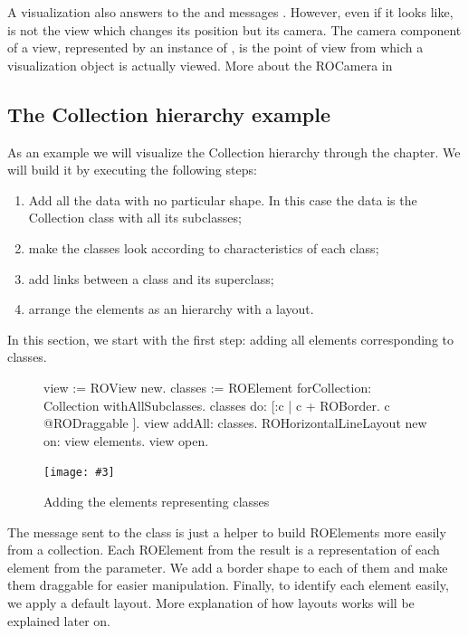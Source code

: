 \documentclass[a4paper,10pt,twoside]{book}
\newcommand{\fig}[4]{
		\begin{figure}[#1]
			\centering
			\texttt{[image: \#3]}
			\caption{\label{fig:#3}#4}
		\end{figure}}
\begin{document}
A visualization  also answers to the  and  messages . However, even if it looks like, is not the view which changes its position but its camera. The camera component of a view, represented by an instance of , is the point of view from which a visualization object is actually viewed. More about the ROCamera in 

\subsection*{The Collection hierarchy example}
As an example we will visualize the Collection hierarchy through the chapter. We will build it by executing the following steps:
\begin{enumerate}
\item Add all the data with no particular shape. In this case the data is the Collection class with all its subclasses;
\item make the classes look according to characteristics of each class;
\item add links between a class and its superclass;
\item arrange the elements as an hierarchy with a layout.
\end{enumerate}

In this section, we start with the first step: adding all elements corresponding to classes. 
\begin{figure}[H]
\begin{code}{}
view := ROView new.
classes := ROElement forCollection: Collection withAllSubclasses.
classes 
	do: [:c | c + ROBorder.
			c @RODraggable ].
view addAll: classes.
ROHorizontalLineLayout new on: view elements.
view open.
\end{code}
\end{figure}

\fig{H}{0.6}{hier1}{Adding the elements representing classes}

The message  sent to the class  is just a helper to build ROElements 
more easily from a collection. Each ROElement from the result is a representation of each element from the parameter. We add a border shape to each of them and make them draggable for easier manipulation.
Finally, to identify each element easily, we apply a default layout. More explanation of how layouts works will be explained later on. 
\end{document}
